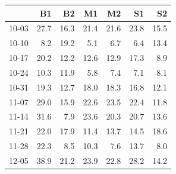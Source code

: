 \begin{tabular}{lrrrrrr}
\toprule
 & B1 & B2 & M1 & M2 & S1 & S2 \\
\midrule
10-03 & 27.7 & 16.3 & 21.4 & 21.6 & 23.8 & 15.5 \\
10-10 & 8.2 & 19.2 & 5.1 & 6.7 & 6.4 & 13.4 \\
10-17 & 20.2 & 12.2 & 12.6 & 12.9 & 17.3 & 8.9 \\
10-24 & 10.3 & 11.9 & 5.8 & 7.4 & 7.1 & 8.1 \\
10-31 & 19.3 & 12.7 & 18.0 & 18.3 & 16.8 & 12.1 \\
11-07 & 29.0 & 15.9 & 22.6 & 23.5 & 22.4 & 11.8 \\
11-14 & 31.6 & 7.9 & 23.6 & 20.3 & 20.7 & 13.6 \\
11-21 & 22.0 & 17.9 & 11.4 & 13.7 & 14.5 & 18.6 \\
11-28 & 22.3 & 8.5 & 10.3 & 7.6 & 13.7 & 8.0 \\
12-05 & 38.9 & 21.2 & 23.9 & 22.8 & 28.2 & 14.2 \\
\bottomrule
\end{tabular}
